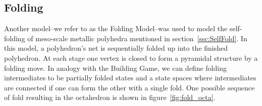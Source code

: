 %
%
%
%
%
%
%
%
%
%
\subsection{Folding}
Another model--we refer to as the Folding Model--was used to model the self-folding of meso-scale metallic polyhedra mentioned in section~\ref{ssc:SelfFold}. In this model, a polyhedron's net is sequentially folded up into the finished polyhedron. At each stage one vertex is closed to form a pyramidal structure by a folding move. In analogy with the Building Game, we can define folding intermediates to be partially folded states and a state spaces where intermediates are connected if one can form the other with a single fold. One possible sequence of fold resulting in the octahedron is shown in figure~\ref{fig:fold_octa}. 

